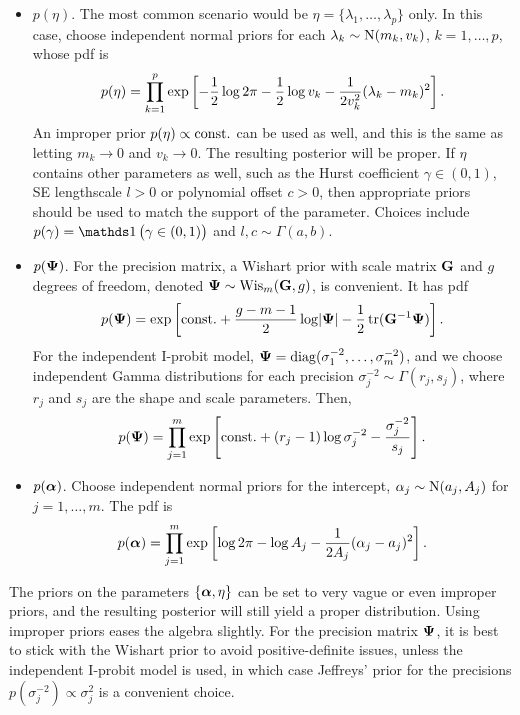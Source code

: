 \begin{itemize}
  \item {\boldmath$p(\eta)$}. The most common scenario would be $\eta = \{\lambda_1,\dots,\lambda_p\}$ only. In this case, choose independent normal priors for each $\lambda_k \sim \N(m_k,v_k)$, $k=1,\dots,p$, whose pdf is
  \begin{align*}
    p(\eta) = \prod_{k=1}^p \exp\left[-\half\log 2\pi - \half\log v_k - \frac{1}{2v_k^2} (\lambda_k - m_k)^2 \right].
  \end{align*} 
  An improper prior $p(\eta) \propto \const$ can be used as well, and this is the same as letting $m_k \to 0$ and $v_k\to 0$.
  The resulting posterior will be proper.
  If $\eta$ contains other parameters as well, such as the Hurst coefficient $\gamma \in (0,1)$, SE lengthscale $l >0$ or polynomial offset $c>0$, then appropriate priors should be used to match the support of the parameter.
  Choices include $p(\gamma) = \ind\big(\gamma \in (0,1)\big)$ and $l,c \sim \Gamma(a,b)$.
  
  \item {\boldmath$p(\bPsi)$}. For the precision matrix, a Wishart prior with scale matrix $\bG$ and $g$ degrees of freedom, denoted $\bPsi \sim \Wis_m(\bG,g)$, is convenient. It has pdf
  \[
    p(\bPsi) = \exp\left[\const + \half[g-m-1]\log \abs{\bPsi} - \half\tr(\bG^{-1}\bPsi)  \right].
  \]
  For the independent I-probit model, $\bPsi = \diag(\sigma_1^{-2},\dots,\sigma_m^{-2})$, and we choose independent Gamma distributions for each precision $\sigma_j^{-2} \sim \Gamma(r_j,s_j)$, where $r_j$ and $s_j$ are the shape and scale parameters.
  Then,
  \[
    p(\bPsi) = \prod_{j=1}^m \exp\left[\const + (r_j - 1)\log \sigma_j^{-2} - \frac{\sigma_j^{-2}}{s_j}\right].
  \] 
  
  \item {\boldmath$p(\balpha)$}. Choose independent normal priors for the intercept, $\alpha_j \sim \N(a_j,A_j)$ for $j=1,\dots,m$. The pdf is
  \[
    p(\balpha) = \prod_{j=1}^m \exp\left[\log 2\pi - \log A_j - \frac{1}{2A_j} (\alpha_j - a_j)^2  \right].
  \]
\end{itemize}

\begin{remark}
  The priors on the parameters $\{ \balpha,\eta \}$ can be set to very vague or even improper priors, and the resulting posterior will still yield a proper distribution.
  Using improper priors eases the algebra slightly.
  For the precision matrix $\bPsi$, it is best to stick with the Wishart prior to avoid positive-definite issues, unless the independent I-probit model is used, in which case Jeffreys' prior for the precisions $p(\sigma_j^{-2})\propto \sigma_j^2$ is a convenient choice.
\end{remark}

